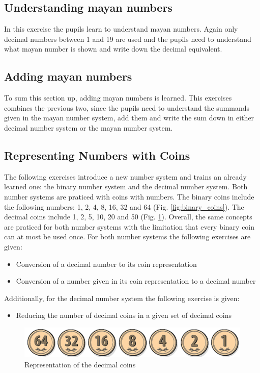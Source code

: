 \subsection*{Understanding mayan numbers}

In this exercise the pupils learn to understand mayan numbers. Again only decimal numbers between 1 and 19 are used and the pupils need to understand what mayan number is shown and write down the decimal equivalent.

\subsection*{Adding mayan numbers}

To sum this section up, adding mayan numbers is learned. This exercises combines the previous two, since the pupils need to understand the summands given in the mayan number system, add them and write the sum down in either decimal number system or the mayan number system.

\subsection{Representing Numbers with Coins}

The following exercises introduce a new number system and trains an already learned one: the binary number system and the decimal number system. Both number systems are praticed with coins with numbers. The binary coins include the following numbers: 1, 2, 4, 8, 16, 32 and 64 (Fig. \ref{fig:binary_coins}). The decimal coins include 1, 2, 5, 10, 20 and 50 (Fig. \ref{fig:decimal_coins}). 
Overall, the same concepts are praticed for both number systems with the limitation that every binary coin can at most be used once. For both number systems the following exercises are given:
\begin{itemize}
    \item Conversion of a decimal number to its coin representation
    \item Conversion of a number given in its coin representation to a decimal number
\end{itemize}
Additionally, for the decimal number system the following exercise is given:
\begin{itemize}
    \item Reducing the number of decimal coins in a given set of decimal coins
\end{itemize}

\begin{figure} 
    \centering
    \includegraphics[width=0.5 \columnwidth]{figures/decimal_coins.png}
    \caption{Representation of the decimal coins} 
    \label{fig:decimal_coins} 
\end{figure}

